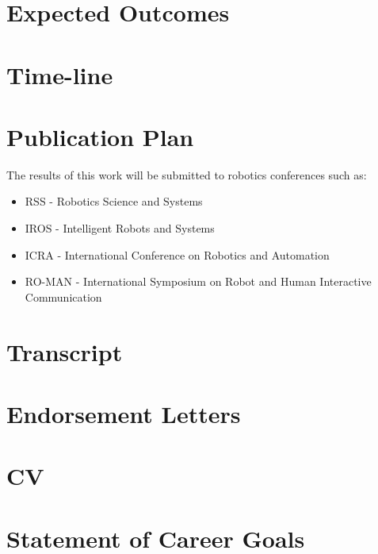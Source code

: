 \documentclass[12pt,a4paper]{article}
\begin{document}
\section{Expected Outcomes}
\section{Time-line}



\newpage
\section{Publication Plan}
The results of this work will be submitted to robotics conferences such as:
\begin{itemize}
 \item RSS - Robotics Science and Systems
 \item IROS - Intelligent Robots and Systems
 \item ICRA - International Conference on Robotics and Automation
 \item RO-MAN - International Symposium on Robot and Human Interactive Communication
\end{itemize}

\section{Transcript}
\section{Endorsement Letters}
\section{CV}
\section{Statement of Career Goals}
\end{document}
